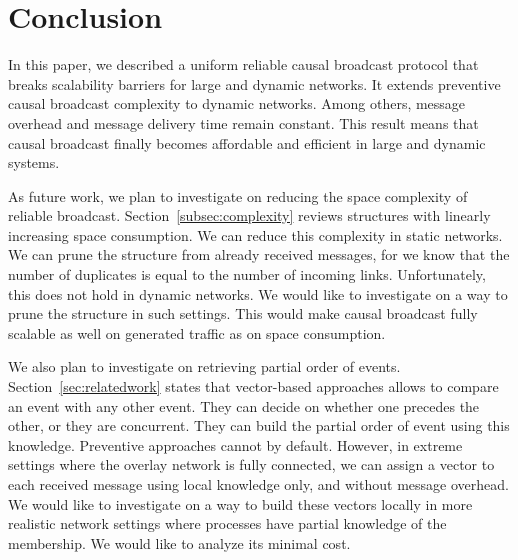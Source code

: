 
\section{Conclusion}
\label{sec:conclusion}

In this paper, we described a uniform reliable causal broadcast protocol that
breaks scalability barriers for large and dynamic networks. It extends
preventive causal broadcast complexity to dynamic networks. Among others,
message overhead and message delivery time remain constant.
This result means that causal broadcast finally becomes affordable and efficient
in large and dynamic systems.

As future work, we plan to investigate on reducing the space complexity of
reliable broadcast. Section~\ref{subsec:complexity} reviews structures with
linearly increasing space consumption. We can reduce this complexity in static
networks. We can prune the structure from already received messages, for we know
that the number of duplicates is equal to the number of incoming
links. Unfortunately, this does not hold in dynamic networks. We would like to
investigate on a way to prune the structure in such settings. This would make
causal broadcast fully scalable as well on generated traffic as on space
consumption.

We also plan to investigate on retrieving partial order of
events. Section~\ref{sec:relatedwork} states that vector-based approaches allows
to compare an event with any other event. They can decide on whether one
precedes the other, or they are concurrent. They can build the partial order of
event using this knowledge. Preventive approaches cannot by default. However, in
extreme settings where the overlay network is fully connected, we can assign a
vector to each received message using local knowledge only, and without message
overhead. We would like to investigate on a way to build these vectors locally
in more realistic network settings where processes have partial knowledge of the
membership. We would like to analyze its minimal cost.

